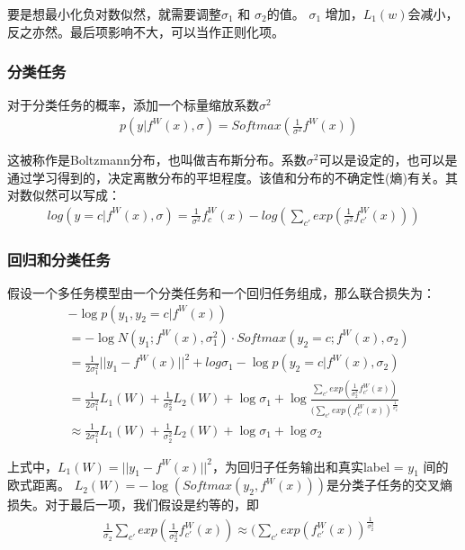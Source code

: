 要是想最小化负对数似然，就需要调整$\sigma_1$ 和 $\sigma_2$的值。 $\sigma_1$ 增加，$L_1(w)$会减小，反之亦然。最后项影响不大，可以当作正则化项。

\subsubsection{分类任务}

对于分类任务的概率，添加一个标量缩放系数$\sigma^2$
\begin{align}
&p(y|f^W(x),\sigma) = Softmax(\frac{1}{\sigma^2}f^W(x))
\end{align}

这被称作是Boltzmann分布，也叫做吉布斯分布。系数$\sigma^2$可以是设定的，也可以是通过学习得到的，决定离散分布的平坦程度。该值和分布的不确定性(熵)有关。其对数似然可以写成：
\begin{align}
log(y=c|f^W(x),\sigma) = \frac{1}{\sigma^2}f_c^W(x) - log(\sum_{c'}exp(\frac{1}{\sigma^2}f^W_{c'}(x)))
\end{align}

\subsubsection{回归和分类任务}
假设一个多任务模型由一个分类任务和一个回归任务组成，那么联合损失为：
\begin{align}
& -\log p(y_1,y_2 = c|f^W(x)) \nonumber \\
& = - \log N(y_1;f^W(x),\sigma_1^2) \cdot Softmax(y_2 = c;f^W(x),\sigma_2) \nonumber \\
& = \frac{1}{2\sigma^2_1}||y_1 - f^W(x)||^2 + log\sigma_1 - \log p(y_2 = c | f^W(x),\sigma_2) \nonumber \\
& = \frac{1}{2\sigma^2_1}L_1(W) +\frac{1}{\sigma^2_2}L_2(W)+ \log \sigma_1+ \log\frac{\sum_{c'}exp(\frac{1}{\sigma^2_2}f_{c'}^W(x))}{(\sum_{c'}exp(f_{c'}^W(x))^{\frac{1}{\sigma^2_2}}}\nonumber \\
&\approx \frac{1}{2\sigma_1^2}L_1(W) + \frac{1}{\sigma^2_2}L_2(W)+\log\sigma_1+ \log\sigma_2
\end{align}

上式中，$L_1(W) = || y_1-f^W(x)||^2$，为回归子任务输出和真实label = $y_1$ 间的欧式距离。 $L_2(W)=-\log (Softmax( y_2 , f^W(x)))$是分类子任务的交叉熵损失。对于最后一项，我们假设是约等的，即
\begin{align}
& \frac{1}{\sigma_2}\sum_{c'}exp(\frac{1}{\sigma^2_2}f_{c'}^W(x)) \approx (\sum_{c'}exp(f_{c'}^W(x))^{\frac{1}{\sigma^2_2}}
\end{align}


